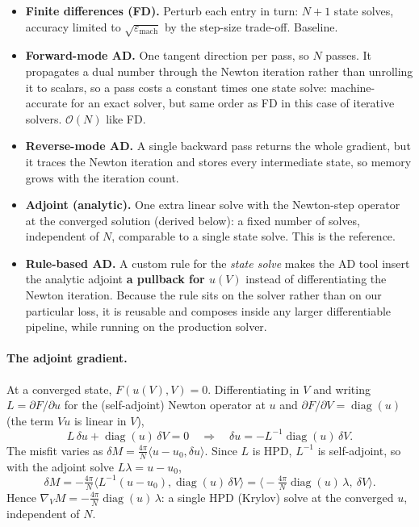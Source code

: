 \documentclass[11pt,a4paper]{article}
\begin{document}
\begin{itemize}
  \item \textbf{Finite differences (FD).} Perturb each entry in turn: $N{+}1$
  state solves, accuracy limited to $\sqrt{\varepsilon_{\mathrm{mach}}}$ by the
  step-size trade-off. Baseline.
  \item \textbf{Forward-mode AD.} One tangent direction per pass, so $N$ passes.
  It propagates a dual number through the Newton iteration rather than unrolling
  it to scalars, so a pass costs a constant times one state solve:
  machine-accurate for an exact solver, but same order as FD in this case of iterative solvers. $\mathcal O(N)$ like FD.
  \item \textbf{Reverse-mode AD.} A single backward pass returns the whole
  gradient, but it traces the Newton iteration and stores every intermediate
  state, so memory grows with the iteration count.
  \item \textbf{Adjoint (analytic).} One extra linear solve with the Newton-step
  operator at the converged solution (derived below): a fixed number of solves,
  independent of $N$, comparable to a single state solve. This is the reference.
  \item \textbf{Rule-based AD.} A custom rule for the \emph{state solve} makes the
  AD tool insert the analytic adjoint \textbf{a pullback for $u(V)$} instead of
  differentiating the Newton iteration. Because the rule sits on the solver rather
  than on our particular loss, it is reusable and composes inside any larger
  differentiable pipeline, while running on the production solver.
\end{itemize}

\paragraph{The adjoint gradient.}
At a converged state, $F(u(V),V)=0$. Differentiating in $V$ and writing
$L=\partial F/\partial u$ for the (self-adjoint) Newton operator at $u$ and
$\partial F/\partial V=\operatorname{diag}(u)$ (the term $Vu$ is linear in $V$),
\[
  L\,\delta u + \operatorname{diag}(u)\,\delta V = 0
  \quad\Longrightarrow\quad
  \delta u = -L^{-1}\operatorname{diag}(u)\,\delta V .
\]
The misfit varies as $\delta M = \tfrac{4\pi}{N}\langle u-u_0,\delta u\rangle$.
Since $L$ is HPD, $L^{-1}$ is self-adjoint, so with the adjoint solve
$L\lambda = u-u_0$,
\[
  \delta M
  = -\tfrac{4\pi}{N}\langle L^{-1}(u-u_0),\operatorname{diag}(u)\,\delta V\rangle
  = \big\langle -\tfrac{4\pi}{N}\operatorname{diag}(u)\,\lambda,\ \delta V\big\rangle .
\]
Hence $\nabla_V M = -\tfrac{4\pi}{N}\operatorname{diag}(u)\,\lambda$: a single HPD
(Krylov) solve at the converged $u$, independent of $N$.
\end{document}
